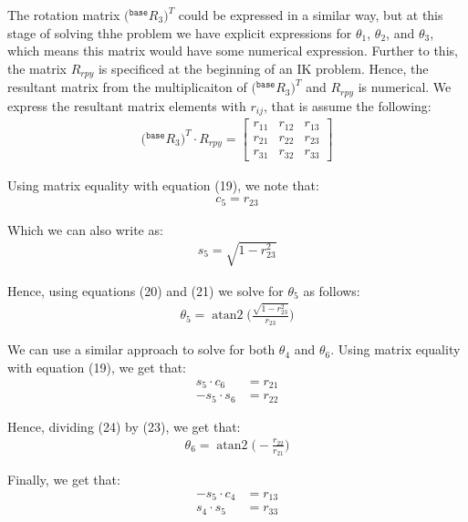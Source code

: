 \documentclass[a4paper]{article}
\DeclareMathOperator{\atantwo}{atan2}
\begin{document}
The rotation matrix $\big({}^{\texttt{base}}R_3\big)^{T}$ could be expressed in a similar way, but at this stage of solving thhe problem we have explicit expressions for $\theta_1$, $\theta_2$, and $\theta_3$, which means this matrix would have some numerical expression. Further to this, the matrix $R_{rpy}$ is specificed at the beginning of an IK problem. Hence, the resultant matrix from the multiplicaiton of $\big({}^{\texttt{base}}R_3\big)^{T}$ and $R_{rpy}$ is numerical. We express the resultant matrix elements with $r_{ij}$, that is assume the following:
\begin{align}
\big({}^{\texttt{base}}R_3\big)^{T} \cdot R_{rpy} =
\begin{bmatrix}
r_{11} & r_{12} & r_{13}\\
r_{21} & r_{22} & r_{23}\\
r_{31} & r_{32} & r_{33}
\end{bmatrix}
\end{align}

Using matrix equality with equation (19), we note that:
\begin{align}
c_5 = r_{23}
\end{align}

Which we can also write as:
\begin{align}
s_5 = \sqrt{1 - r_{23}^2}
\end{align}

Hence, using equations (20) and (21) we solve for $\theta_5$ as follows:
\begin{align}
\theta_5 = \atantwo \bigg(\frac{\sqrt{1 - r_{23}^2}}{r_{23}}\bigg)
\end{align}

We can use a similar approach to solve for both $\theta_4$ and $\theta_6$. Using matrix equality with equation (19), we get that:
\begin{align}
s_5 \cdot c_6 &= r_{21}\\ -s_5 \cdot s_6 &= r_{22}
\end{align}

Hence, dividing (24) by (23), we get that:
\begin{align}
\theta_6 = \atantwo \bigg(-\frac{r_{22}}{r_{21}}\bigg)
\end{align}

Finally, we get that:
\begin{align}
-s_5 \cdot c_4 &= r_{13}\\
s_4 \cdot s_5 &= r_{33}
\end{align}
\end{document}
